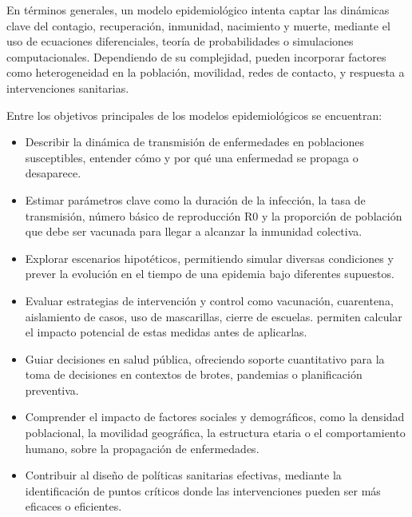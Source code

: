 En términos generales, un modelo epidemiológico intenta captar las dinámicas clave del contagio, recuperación, inmunidad, nacimiento y muerte, mediante el uso de ecuaciones diferenciales, teoría de probabilidades o simulaciones computacionales. Dependiendo de su complejidad, pueden incorporar factores como heterogeneidad en la población, movilidad, redes de contacto, y respuesta a intervenciones sanitarias.

Entre los objetivos principales de los modelos epidemiológicos se encuentran:
\begin{itemize}
    \item Describir la dinámica de transmisión de enfermedades en poblaciones susceptibles, entender cómo y por qué una enfermedad se propaga o desaparece.
    \item Estimar parámetros clave como la duración de la infección, la tasa de transmisión, número básico de reproducción R0 y la proporción de población que debe ser vacunada para llegar a alcanzar la inmunidad colectiva.
    \item Explorar escenarios hipotéticos, permitiendo simular diversas condiciones y prever la evolución en el tiempo de una epidemia bajo diferentes supuestos.
    \item Evaluar estrategias de intervención y control como vacunación, cuarentena, aislamiento de casos, uso de mascarillas, cierre de escuelas. permiten calcular el impacto potencial de estas medidas antes de aplicarlas.
    \item Guiar decisiones en salud pública, ofreciendo soporte cuantitativo para la toma de decisiones en contextos de brotes, pandemias o planificación preventiva.
    \item Comprender el impacto de factores sociales y demográficos, como la densidad poblacional, la movilidad geográfica, la estructura etaria o el comportamiento humano, sobre la propagación de enfermedades.
    \item Contribuir al diseño de políticas sanitarias efectivas, mediante la identificación de puntos críticos donde las intervenciones pueden ser más eficaces o eficientes.
\end{itemize}

